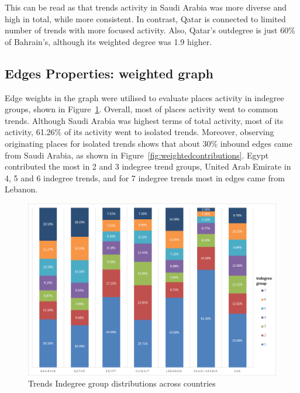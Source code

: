 \documentclass{llncs}
\begin{document}
This can be read as that trends activity in Saudi Arabia was more
diverse and high in total, while more consistent. In contrast, Qatar
is connected to limited number of trends with more focused
activity. Also, Qatar’s outdegree is just 60\% of Bahrain’s, although
its weighted degree was 1.9 higher. 


\subsection{Edges Properties: weighted graph}

Edge weights in the graph were utilised to evaluate places activity in
indegree groups, shown in
Figure~\ref{fig:indegreegrouptrends}. Overall, most of places activity
went to common trends. Although Saudi Arabia was highest terms of
total activity, most of its activity, 61.26\% of its activity went to
isolated trends. Moreover, observing originating places for isolated
trends shows that about 30\% inbound edges came from Saudi Arabia, as
shown in Figure~\ref{fig:weightedcontributions}. Egypt contributed the
most in 2 and 3 indegree trend groups, United Arab Emirate in 4, 5 and
6 indegree trends, and for 7 indegree trends most in edges came from
Lebanon.

\begin{figure}[htb]
\centering
\includegraphics[width=\columnwidth]{images/indegreegrouptrends.png}
\caption{Trends Indegree group distributions across countries}
\label{fig:indegreegrouptrends}
\end{figure}
\end{document}
